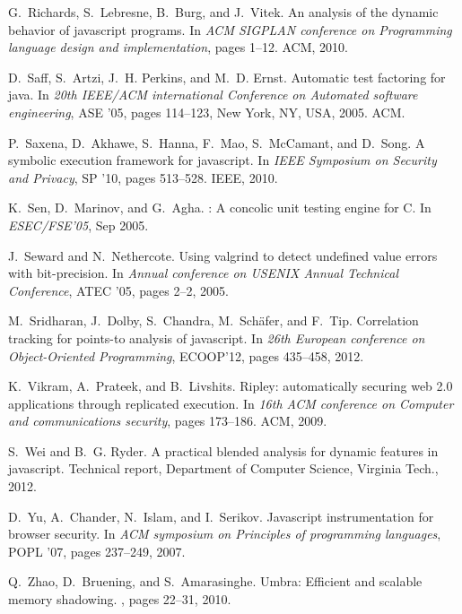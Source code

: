 \documentclass{sig-alternate}
\begin{document}
{\begin{thebibliography}{10}
G.~Richards, S.~Lebresne, B.~Burg, and J.~Vitek.
\newblock An analysis of the dynamic behavior of javascript programs.
\newblock In {\em ACM SIGPLAN conference on Programming language design and
  implementation}, pages 1--12. ACM, 2010.

D.~Saff, S.~Artzi, J.~H. Perkins, and M.~D. Ernst.
\newblock Automatic test factoring for java.
\newblock In {\em 20th IEEE/ACM international Conference on Automated software
  engineering}, ASE '05, pages 114--123, New York, NY, USA, 2005. ACM.

P.~Saxena, D.~Akhawe, S.~Hanna, F.~Mao, S.~McCamant, and D.~Song.
\newblock A symbolic execution framework for javascript.
\newblock In {\em IEEE Symposium on Security and Privacy}, SP '10, pages
  513--528. IEEE, 2010.

K.~Sen, D.~Marinov, and G.~Agha.
: A concolic unit testing engine for {C}.
\newblock In {\em ESEC/FSE'05}, Sep 2005.

J.~Seward and N.~Nethercote.
\newblock Using valgrind to detect undefined value errors with bit-precision.
\newblock In {\em Annual conference on USENIX Annual Technical Conference},
  ATEC '05, pages 2--2, 2005.

M.~Sridharan, J.~Dolby, S.~Chandra, M.~Sch\"{a}fer, and F.~Tip.
\newblock Correlation tracking for points-to analysis of javascript.
\newblock In {\em 26th European conference on Object-Oriented Programming},
  ECOOP'12, pages 435--458, 2012.

K.~Vikram, A.~Prateek, and B.~Livshits.
\newblock Ripley: automatically securing web 2.0 applications through
  replicated execution.
\newblock In {\em 16th ACM conference on Computer and communications security},
  pages 173--186. ACM, 2009.

S.~Wei and B.~G. Ryder.
\newblock A practical blended analysis for dynamic features in javascript.
\newblock Technical report, Department of Computer Science, Virginia Tech.,
  2012.

D.~Yu, A.~Chander, N.~Islam, and I.~Serikov.
\newblock Javascript instrumentation for browser security.
\newblock In {\em ACM symposium on Principles of programming languages}, POPL
  '07, pages 237--249, 2007.

Q.~Zhao, D.~Bruening, and S.~Amarasinghe.
\newblock Umbra: Efficient and scalable memory shadowing.
, pages 22--31, 2010.

\end{thebibliography}
}
% 
% 
\end{document}
